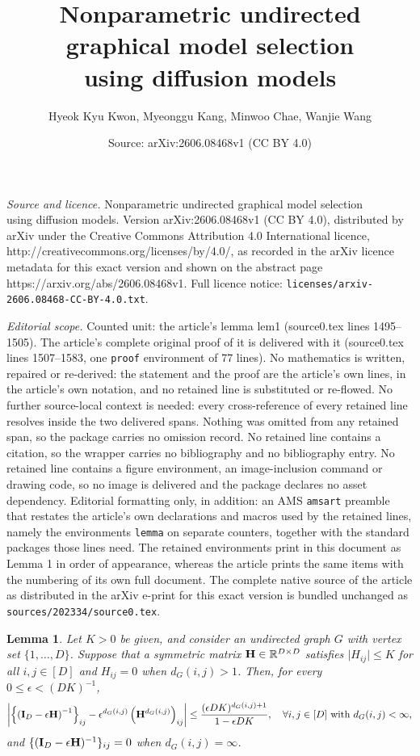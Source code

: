 \documentclass[10pt,a4paper]{amsart}
\title{\vspace*{-9mm} Nonparametric undirected graphical model selection \\ using diffusion models}
\author{Hyeok Kyu Kwon, Myeonggu Kang, Minwoo Chae, Wanjie Wang}
\date{Source: arXiv:2606.08468v1 (CC BY 4.0)}
\newtheorem{lemma}{Lemma}
\newcommand{\bH}{{\bf H}}
\newcommand{\bI}{{\bf I}}
\newcommand{\bbR}{{\mathbb R}}
\newcommand{\bean}{\setlength\arraycolsep{1pt}\begin{eqnarray*}}
\newcommand{\eean}{\end{eqnarray*}}
\begin{document}
\maketitle

\noindent\emph{Source and licence.} \vspace*{-9mm} Nonparametric undirected graphical model selection \\ using diffusion models. Version arXiv:2606.08468v1 (CC BY 4.0), distributed by arXiv under the Creative Commons Attribution 4.0 International licence, http://creativecommons.org/licenses/by/4.0/, as recorded in the arXiv licence metadata for this exact version and shown on the abstract page https://arxiv.org/abs/2606.08468v1. Full licence notice: \texttt{licenses/arxiv-2606.08468-CC-BY-4.0.txt}.\par\smallskip

\noindent\textit{Editorial scope.} Counted unit: the article's lemma lem1 (source0.tex lines 1495--1505). The article's complete original proof of it is delivered with it (source0.tex lines 1507--1583, one \texttt{proof} environment of 77 lines). No mathematics is written, repaired or re-derived: the statement and the proof are the article's own lines, in the article's own notation, and no retained line is substituted or re-flowed.  No further source-local context is needed: every cross-reference of every retained line resolves inside the two delivered spans.  Nothing was omitted from any retained span, so the package carries no omission record.  No retained line contains a citation, so the wrapper carries no bibliography and no bibliography entry.  No retained line contains a figure environment, an image-inclusion command or drawing code, so no image is delivered and the package declares no asset dependency.  Editorial formatting only, in addition: an AMS \texttt{amsart} preamble that restates the article's own declarations and macros used by the retained lines, namely the environments \texttt{lemma} on separate counters, together with the standard packages those lines need.  The retained environments print in this document as Lemma 1 in order of appearance, whereas the article prints the same items with the numbering of its own full document.  The complete native source of the article as distributed in the arXiv e-print for this exact version is bundled unchanged as \texttt{sources/202334/source0.tex}.
\begin{lemma}\label{lem1}
Let $K > 0$ be given, and consider an undirected graph $G$ with vertex set $\{1,\ldots,D\}$.
Suppose that a symmetric matrix $\bH  \in \bbR^{D \times D}$ satisfies $\vert H_{ij} \vert \leq K$ for all $i,j \in [D]$ and $H_{ij} = 0$ when $d_{G}(i,j) > 1$.
Then, for every $0 \leq \epsilon < (DK)^{-1}$,
\bean
\left\vert \left\{ \left( \bI_{D} - \epsilon \bH \right)^{-1} \right\}_{ij} - \epsilon^{d_{G}(i,j)} \left( \bH^{d_{G}(i,j)} \right)_{ij} \right\vert 
\leq \frac{ (\epsilon D K)^{d_{G}(i,j)+1} }{1-\epsilon D K}
, \quad \forall i, j \in [D] \text{ with } d_{G}(i,j) < \infty,
\eean
and $\{ (\bI_{D} - \epsilon \bH)^{-1}\}_{ij} = 0$ when $d_{G}(i,j) = \infty$.
\end{lemma}
\end{document}
